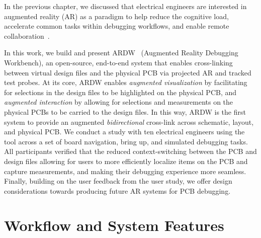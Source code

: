 \documentclass [11pt, proquest] {uwthesis}[2020/02/24]
\newcommand{\ARDWname}{ARDW}
\begin{document}
In the previous chapter, we discussed that electrical engineers are interested in augmented reality (AR) as a paradigm to help reduce the cognitive load, accelerate common tasks within debugging workflows, and enable remote collaboration~\cite{Chatterjee2021AugmentedBoards}.


In this work, we build and present \ARDWname~ (Augmented Reality Debugging Workbench), an open-source, end-to-end %
system that enables cross-linking between virtual design files and the physical PCB via projected AR and tracked test probes.
{At its core, {\ARDWname} enables \textit{augmented visualization} by facilitating for selections in the design files to be highlighted on the physical PCB, and \textit{augmented interaction} by allowing for selections and measurements on the physical PCBs to be carried to the design files.}
{In this way, {\ARDWname} is the first system to provide an augmented \textit{bidirectional} cross-link across schematic, layout, and physical PCB.}
We conduct a study with ten electrical engineers using the tool across a set of board navigation, bring up, and simulated debugging tasks. All participants verified that the reduced context-switching between the PCB and design files allowing for users to more efficiently localize items on the PCB and capture measurements, and making their debugging experience more seamless.
Finally, building on the user feedback from the user study, we offer design considerations towards producing future AR systems for PCB debugging.

\section{Workflow and System Features}
\label{sec:workflow}
\newcommand{\personname}{Kofi}
\newcommand{\persontwoname}{Deepali}
\end{document}
